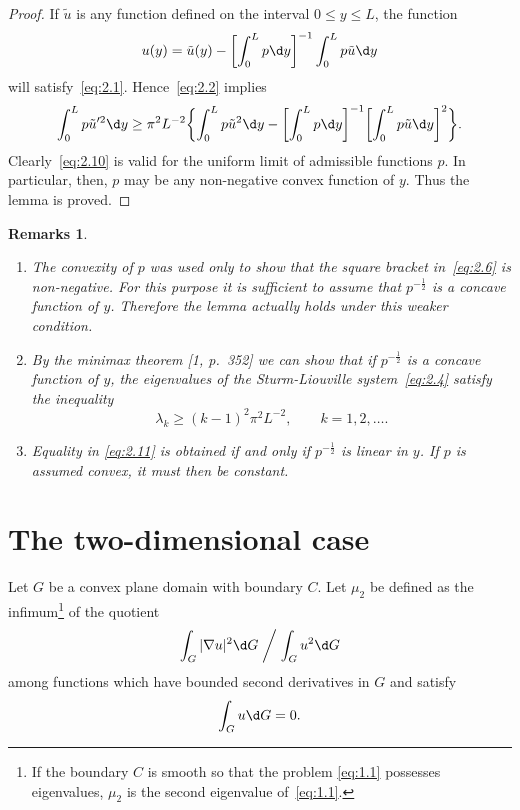 \documentclass{article}
\theoremstyle{remarks}
\newtheorem*{remarks}{Remarks}
\begin{document}
\begin{proof}
  If $\tilde{u}$ is any function defined on the interval $0\leq y\leq L$,
  the function
  \begin{equation}\label{eq:2.9}
    u(y) = \tilde{u}(y) - \biggl[\int_0^L p \d y\biggr]^{-1} \int_0^L p\tilde{u} \d y
  \end{equation}
  will satisfy~\eqref{eq:2.1}. Hence~\eqref{eq:2.2} implies
  \begin{equation}\label{eq:2.10}
    \int_0^L p\tilde{u}'^2 \d y \geq \pi^2 L^{-2} 
    \biggl\{\int_0^L p\tilde{u}^2 \d y - \biggl[\int_0^L p \d y\biggr]^{-1}
      \biggl[\int_0^L p\tilde{u} \d y\biggr]^2\biggr\}.
  \end{equation}
  Clearly~\eqref{eq:2.10} is valid for the uniform limit of admissible
  functions $p$. In particular, then, $p$ may be any non-negative convex function of $y$.
  Thus the lemma is proved.
\end{proof}

\begin{remarks}
  \begin{enumerate}[label = \arabic*.]
    \item The convexity of $p$ was used only to show that the square bracket
      in~\eqref{eq:2.6} is non-negative. For this purpose it is sufficient
      to assume that $p^{-\frac12}$ is a concave function of $y$.
      Therefore the lemma actually holds under this weaker condition.
    \item By the minimax theorem [1, p.~352] we can show that if $p^{-\frac12}$
      is a concave function of $y$, the eigenvalues of the Sturm-Liouville
      system~\eqref{eq:2.4} satisfy the inequality
      \begin{equation}\label{eq:2.11}
        \lambda_k \geq (k-1)^2 \pi^2 L^{-2},\qquad k=1,2,\ldots.
      \end{equation}
    \item Equality in \eqref{eq:2.11} is obtained if and only if $p^{-\frac12}$
      is linear in $y$. If $p$ is assumed convex, it must then be constant.
  \end{enumerate}
\end{remarks}


\section{The two-dimensional case}

Let $G$ be a convex plane domain with boundary $C$.
Let $\mu_2$ be defined as the infimum\footnote{If the boundary
$C$ is smooth so that the problem \eqref{eq:1.1} possesses eigenvalues,
$\mu_2$ is the second eigenvalue of~\eqref{eq:1.1}.}
of the quotient
\begin{equation}\label{eq:3.1}
  \int_G |\nabla u|^2 \d G \biggm/ \int_G u^2 \d G
\end{equation}
among functions which have bounded second derivatives in $G$ and satisfy
\begin{equation}\label{eq:3.2}
  \int_G u \d G = 0.
\end{equation}
\end{document}
